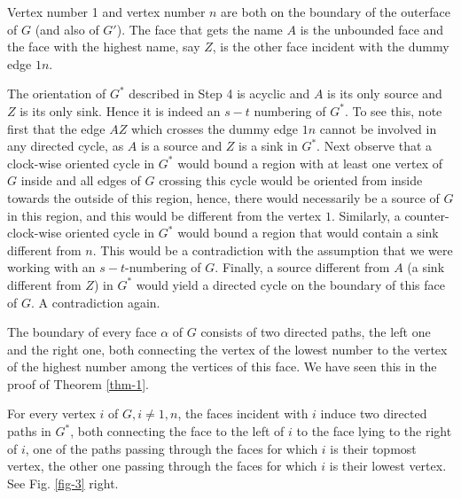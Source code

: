 \begin{claim}
	Vertex number 1 and vertex number $n$ are both on the boundary of the outerface of $G$ (and also of $G'$). The face that gets the name $A$ is the unbounded face and the face with the highest name, say $Z$, is the other face incident with the dummy edge $1n$.
\end{claim}

\begin{claim}
	The orientation of $G^\ast$ described in Step 4 is acyclic and $A$ is its only source and $Z$ is its only sink. Hence it is indeed an $s - t$ numbering of $G^\ast$. To see this, note first that the edge $AZ$ which crosses the dummy edge $1n$ cannot be involved in any directed cycle, as $A$ is a source and $Z$ is a sink in $G^\ast$. Next observe that a clock-wise oriented cycle in $G^\ast$ would bound a region with at least one vertex of $G$ inside and all edges of $G$ crossing this cycle would be oriented from inside towards the outside of this region, hence, there would necessarily be a source of $G$ in this region, and this would be different from the vertex $1$. Similarly, a counter-clock-wise oriented cycle in $G^\ast$ would bound a region that would contain a sink different from $n$. This would be a contradiction with the assumption that we were working with an $s - t$-numbering of $G$. Finally, a source different from $A$ (a sink different from $Z$) in $G^\ast$ would yield a directed cycle on the boundary of this face of $G$. A contradiction again.
\end{claim}

\begin{claim}
	The boundary of every face $\alpha$ of $G$ consists of two directed paths, the left one and the right one, both connecting the vertex of the lowest number to the vertex of the highest number among the vertices of this face. We have seen this in the proof of Theorem \ref{thm-1}.
\end{claim}

\begin{claim}
	For every vertex $i$ of $G, i \neq 1, n$, the faces incident with $i$ induce two directed paths in $G^\ast$,
	both connecting the face to the left of $i$ to the face lying to the right of $i$, one of the paths passing
	through the faces for which $i$ is their topmost vertex, the other one passing through the faces for which
	$i$ is their lowest vertex. See Fig. \ref{fig-3} right.
	\label{claim-4}
\end{claim}


